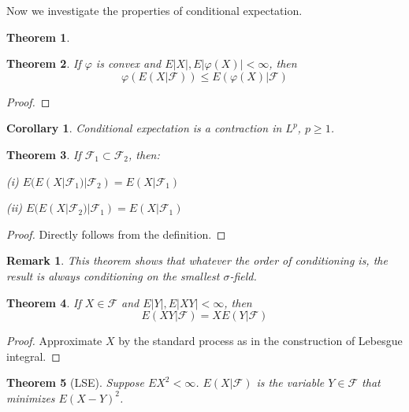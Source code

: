 \documentclass{article}
\newtheorem{Thm}{Theorem}[section]
\newtheorem{Cor}{Corollary}[Thm]
\newtheorem*{Rk}{Remark}
\theoremstyle{definition}
\begin{document}
Now we investigate the properties of conditional expectation.
\begin{Thm}

\end{Thm}
\begin{Thm}
If $\varphi$ is convex and $E\left|X\right|,E\left|\varphi(X)\right|<\infty$, then \[\varphi(E(X|\mathcal{F}))\le E(\varphi(X)|\mathcal{F})\]
\end{Thm}
\begin{proof}

\end{proof}
\begin{Cor}
Conditional expectation is a contraction in $L^p$, $p\ge 1$.
\end{Cor}
\begin{Thm}
If $\mathcal{F}_1\subset\mathcal{F}_2$, then:\par
(i) $E(E(X|\mathcal{F}_1)|\mathcal{F}_2)=E(X|\mathcal{F}_1)$\par
(ii) $E(E(X|\mathcal{F}_2)|\mathcal{F}_1)=E(X|\mathcal{F}_1)$
\end{Thm}
\begin{proof}
Directly follows from the definition.
\end{proof}
\begin{Rk}
This theorem shows that whatever the order of conditioning is, the result is always conditioning on the smallest $\sigma$-field.
\end{Rk}
\begin{Thm}
If $X\in\mathcal{F}$ and $E\left|Y\right|,E\left|XY\right|<\infty$, then \[E(XY|\mathcal{F})=XE(Y|\mathcal{F})\]
\end{Thm}
\begin{proof}
Approximate $X$ by the standard process as in the construction of Lebesgue integral.
\end{proof}
\begin{Thm}[LSE]
Suppose $EX^2<\infty$. $E(X|\mathcal{F})$ is the variable $Y\in\mathcal{F}$ that minimizes $E(X-Y)^2$.
\end{Thm}
\end{document}
